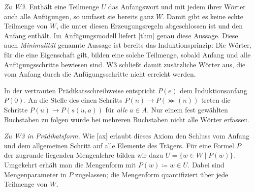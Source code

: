 \noindent\begin{minipage}{\linewidth}

\smallskip\noindent\textit{Zu W3.} Enthält eine Teilmenge \(U\) das
Anfangswort und mit jedem ihrer Wörter auch alle Anfügungen, so umfasst
sie bereits ganz \(W\). Damit gibt es keine echte Teilmenge von \(W\),
die unter diesen Erzeugungsregeln abgeschlossen ist und den Anfang
enthält. Im Anfügungsmodell liefert
[thm] genau diese Aussage.
Diese auch \emph{Minimalität} genannte Aussage ist bereits das
Induktionsprinzip: Die Wörter, für die eine Eigenschaft gilt, bilden eine
solche Teilmenge, sobald Anfang und alle Anfügungsschritte bewiesen sind.
W3 schließt damit zusätzliche Wörter aus, die vom Anfang durch die
Anfügungsschritte nicht erreicht werden.
\end{minipage}\par

In der vertrauten Prädikatsschreibweise entspricht \(P(e)\) dem
Induktionsanfang \(P(0)\). An die Stelle des einen Schritts
\(P(n)\rightarrow P(\Succ(n))\) treten die Schritte
\(P(u)\rightarrow P(s(u,a))\) für \emph{alle} \(a\in A\).
Nur einem fest gewählten Buchstaben zu folgen würde bei mehreren
Buchstaben nicht alle Wörter erfassen.

\noindent\begin{minipage}{\linewidth}

\smallskip\noindent\textit{Zu W3 in Prädikatsform.}
Wie [ax] erlaubt dieses Axiom den
Schluss vom Anfang und dem allgemeinen Schritt auf alle Elemente des
Trägers. Für eine Formel \(P\) der zugrunde liegenden Mengenlehre bilden
wir dazu \(U=\{w\in W\mid P(w)\}\). Umgekehrt erhält man die Mengenform
mit \(P(w)\coloneqq w\in U\). Dabei sind Mengenparameter in \(P\)
zugelassen; die Mengenform quantifiziert über jede Teilmenge von \(W\).
\end{minipage}\par

